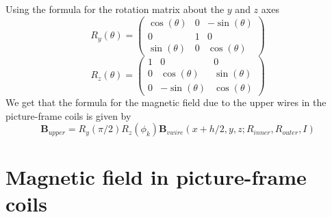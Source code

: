 \documentclass{article}
\begin{document}
Using the formula for the rotation matrix about the $y$ and $z$ axes
\[R_y(\theta) = \begin{pmatrix}
    \cos(\theta) & 0 & -\sin(\theta) \\
    0 & 1 & 0 \\
    \sin(\theta) & 0 & \cos(\theta)
\end{pmatrix}\]
\[R_z(\theta) = \begin{pmatrix}
    1 & 0 & 0 \\
    0 & \cos(\theta) & \sin(\theta) \\
    0 & -\sin(\theta) & \cos(\theta)
\end{pmatrix}\]
We get that the formula for the magnetic field due to the upper wires in the
 picture-frame coils is given by
\[\mathbf{B}_{upper} = R_y(\pi/2)R_z(\phi_k)\mathbf{B}_{vwire}(x+h/2, y, z; R_{inner}, R_{outer}, I)\]

\section{Magnetic field in picture-frame coils}
\end{document}
